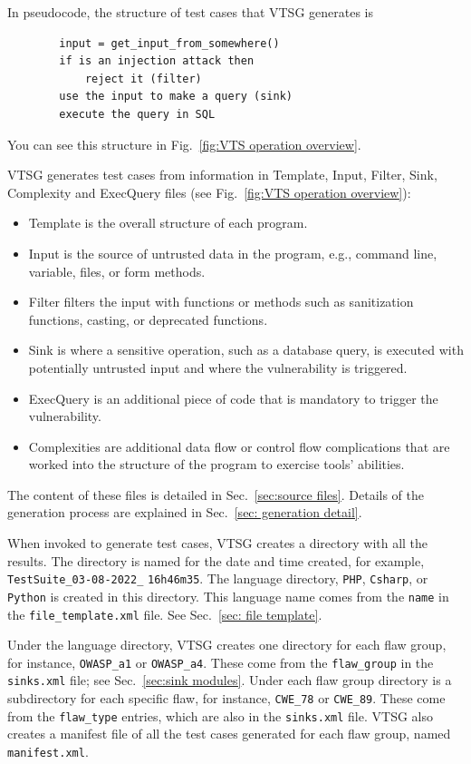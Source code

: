 \documentclass[12pt]{article}
\begin{document}
In pseudocode, the structure of test cases that VTSG generates is
\begin{verbatim}
        input = get_input_from_somewhere()
        if is an injection attack then
            reject it (filter)
        use the input to make a query (sink)
        execute the query in SQL
\end{verbatim}
You can see this structure in Fig.~\ref{fig:VTS operation overview}.

VTSG generates test cases from information in Template, Input,
Filter, Sink, Complexity and ExecQuery files 
(see Fig.~\ref{fig:VTS operation overview}):
\begin{itemize}
 \item Template is the overall structure of each program.
 \item Input is the source of untrusted data in the program, e.g., 
 command line, variable, files, or form methods.
 \item Filter filters the input with functions or methods such as sanitization
   functions, casting, or deprecated functions.
 \item Sink is where a sensitive operation, such as a database query, 
 is executed with potentially untrusted input and where the 
 vulnerability is triggered.
 \item ExecQuery is an additional piece of code that is mandatory to 
 trigger the vulnerability.
 \item Complexities are additional data flow or control flow complications that are
   worked into the structure of the program to exercise tools' abilities.
\end{itemize}
The content of these files is detailed in
Sec.~\ref{sec:source files}.
Details of the generation process are explained in
Sec.~\ref{sec: generation detail}.

\label{sec:case directory structure}
When invoked to generate test cases, VTSG creates a directory with all the results.
The directory is named for the date and time created, for example,
\verb|TestSuite_03-08-2022_| \verb|16h46m35|.
The language directory, \verb|PHP|,
\verb|Csharp|, or \verb|Python| is created in this directory.
This language name comes from the \verb|name|
in the \verb|file_template.xml| file.  See Sec.~\ref{sec: file template}.

Under the language directory, VTSG creates one directory for each flaw group, for
instance, \verb|OWASP_a1| or \verb|OWASP_a4|.  These come from the \verb|flaw_group|
in the \verb|sinks.xml| file; see Sec.~\ref{sec:sink modules}.
Under each flaw group directory is a subdirectory for each specific flaw, for
instance, \verb|CWE_78| or \verb|CWE_89|.  These come from the \verb|flaw_type|
entries, which are also in the \verb|sinks.xml| file.
VTSG also creates a manifest file of all the test cases generated for each flaw
group, named
\verb|manifest.xml|.
\end{document}
